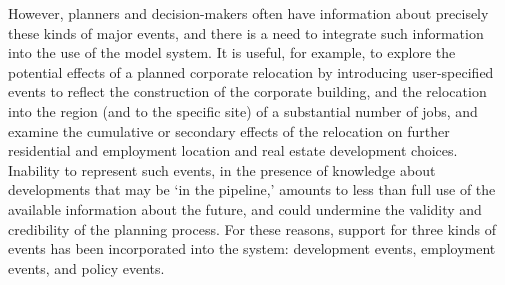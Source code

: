 However, planners and decision-makers often have information about
precisely these kinds of major events, and there is a need to
integrate such information into the use of the model system.  It
is useful, for example, to explore the potential effects of a
planned corporate relocation by introducing user-specified events
to reflect the construction of the corporate building, and the
relocation into the region (and to the specific site) of a
substantial number of jobs, and examine the cumulative or
secondary effects of the relocation on further residential and
employment location and real estate development choices. Inability
to represent such events, in the presence of knowledge about
developments that may be `in the pipeline,' amounts to less than
full use of the available information about the future, and could
undermine the validity and credibility of the planning process.
For these reasons, support for three kinds of events has been
incorporated into the system: development events, employment
events, and policy events.



%
%